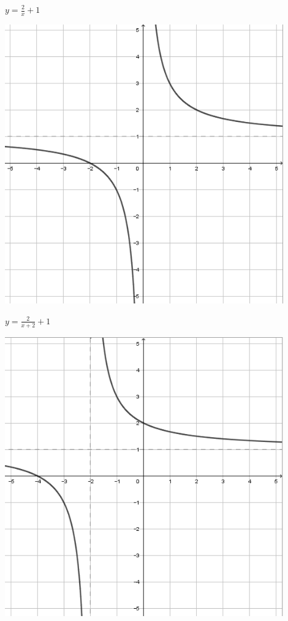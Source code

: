 \documentclass[a4paper]{oblivoir}
\begin{document}
\begin{minipage}{0.45\textwidth}\centering
\(y=\frac2x+1\)
\par\bigskip\includegraphics[width=0.9\textwidth]{img/19-3}
\end{minipage}
\begin{minipage}{0.45\textwidth}\centering
\(y=\frac2{x+2}+1\)
\par\bigskip\includegraphics[width=0.9\textwidth]{img/19-4}
\end{minipage}\bigskip\bigskip\par
\end{document}
